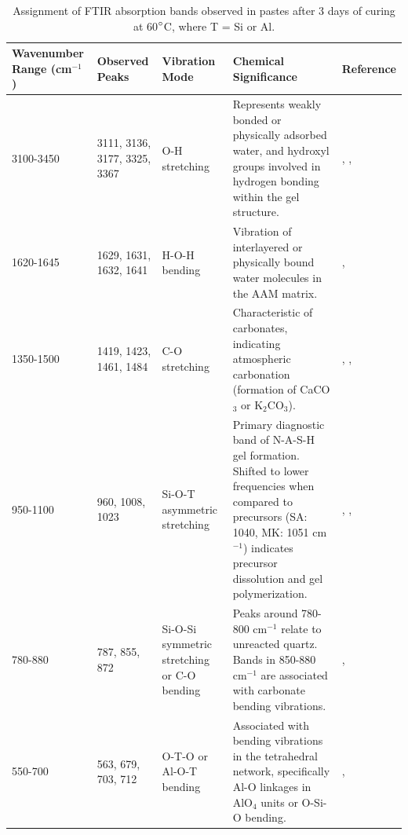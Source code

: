 \begin{landscape}
    \begin{table}[p]
    \centering
    \caption{Assignment of FTIR absorption bands observed in pastes after 3 days of curing at 60$^{\circ}$C, where T = Si or Al.}
    \vspace{0.5cm}
    {\small %
    \renewcommand{\arraystretch}{1.2} %
    \begin{tabular}{p{2.5cm} p{2.5cm} p{3cm} p{8cm} p{3cm}}
        \hline
        Wavenumber Range (cm$^{-1}$) & Observed Peaks & Vibration Mode & Chemical Significance & Reference \\
        \hline
        3100-3450 & 3111, 3136, 3177, 3325, 3367 & O-H stretching & Represents weakly bonded or physically adsorbed water, and hydroxyl groups involved in hydrogen bonding within the gel structure. & \cite{Zhao2023}, \cite{provis2009geopolymers}, \cite{ma2022calcium}\\
        1620-1645 & 1629, 1631, 1632, 1641 & H-O-H bending & Vibration of interlayered or physically bound water molecules in the AAM matrix. & \cite{Zhao2023}, \cite{pachecotorgal2014handbook}\\
        1350-1500 & 1419, 1423, 1461, 1484 & C-O stretching & Characteristic of carbonates, indicating atmospheric carbonation (formation of CaCO$_3$ or K$_2$CO$_3$). & \cite{Zhao2023}, \cite{pachecotorgal2014handbook}, \cite{moraes2024scsa}\\
        950-1100 & 960, 1008, 1023 & Si-O-T asymmetric stretching & Primary diagnostic band of N-A-S-H gel formation. Shifted to lower frequencies when compared to precursors (SA: 1040, MK: 1051 cm$^{-1}$) indicates precursor dissolution and gel polymerization. & \cite{ma2022calcium}, \cite{Zhao2023}, \cite{provis2009geopolymers}\\
        780-880 & 787, 855, 872 & Si-O-Si symmetric stretching or C-O bending & Peaks around 780-800 cm$^{-1}$ relate to unreacted quartz. Bands in 850-880 cm$^{-1}$ are associated with carbonate bending vibrations. & \cite{moraes2024scsa}, \cite{pachecotorgal2014handbook}\\
        550-700 & 563, 679, 703, 712 & O-T-O or Al-O-T bending & Associated with bending vibrations in the tetrahedral network, specifically Al-O linkages in AlO$_4$ units or O-Si-O bending. & \cite{Zhao2023}, \cite{ma2022calcium} \\
        \hline
    \end{tabular}
    }
    \label{tab:ftir_assignments}
    \end{table}
\end{landscape}